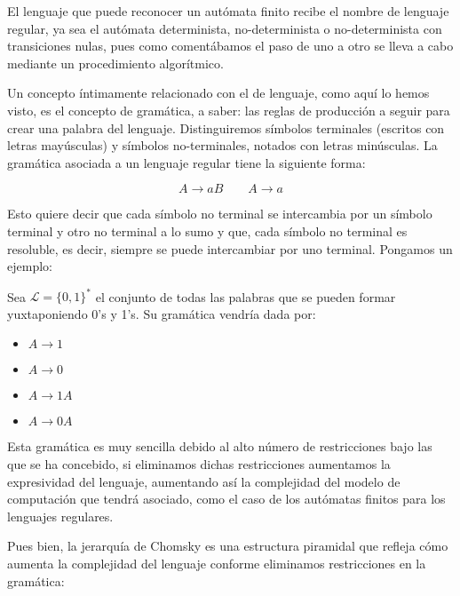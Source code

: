 El lenguaje que puede reconocer un autómata finito recibe el nombre de lenguaje regular, ya sea el autómata determinista, no-determinista o no-determinista con transiciones nulas, pues como comentábamos el paso de uno a otro se lleva a cabo mediante un procedimiento algorítmico.

\vspace{10px}

Un concepto íntimamente relacionado con el de lenguaje, como aquí lo hemos visto, es el concepto de gramática, a saber: las reglas de producción a seguir para crear una palabra del lenguaje. Distinguiremos símbolos terminales (escritos con letras mayúsculas) y símbolos no-terminales, notados con letras minúsculas. La gramática asociada a un lenguaje regular tiene la siguiente forma:


$$ A \rightarrow a B \quad \quad A \rightarrow a$$

Esto quiere decir que cada símbolo no terminal se intercambia por un símbolo terminal y otro no terminal a lo sumo y que, cada símbolo no terminal es resoluble, es decir, siempre se puede intercambiar por uno terminal. Pongamos un ejemplo:

\vspace{10px}

Sea $\mathcal{L}=\{0,1\}^*$ el conjunto de todas las palabras que se pueden formar yuxtaponiendo 0's y 1's. Su gramática vendría dada por:


\begin{multicols}{2}
	\begin{itemize}
		\item $A \rightarrow 1$
		\item $A \rightarrow 0$
		\item $A \rightarrow 1A$
		\item $A \rightarrow 0A$
	\end{itemize}
\end{multicols}


Esta gramática es muy sencilla debido al alto número de restricciones bajo las que se ha concebido, si eliminamos dichas restricciones aumentamos la expresividad del lenguaje, aumentando así la complejidad del modelo de computación que tendrá asociado, como el caso de los autómatas finitos para los lenguajes regulares.

\vspace{10px}

Pues bien, la jerarquía de Chomsky es una estructura piramidal que refleja cómo aumenta la complejidad del lenguaje conforme eliminamos restricciones en la gramática:

